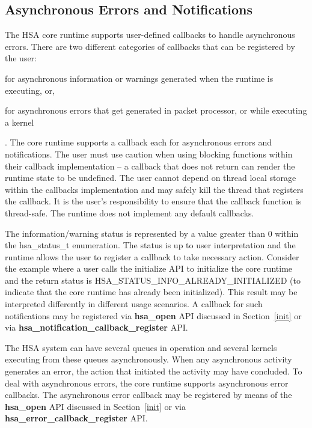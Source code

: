 \documentclass[final]{book}
\newcommand{\mariotodo}[1]{\todo[color=CarnationPink]{#1}}
\newcommand{\reffun}[1]{\textbf{#1}}
\newcommand{\reftyp}[1]{#1}
\newcommand{\refenu}[1]{\reftyp{#1}}
\begin{document}
\hypertarget{asyncerror}{}\subsection{Asynchronous Errors and
Notifications}\label{asyncerror}

The HSA core runtime supports user-defined callbacks to handle asynchronous
errors. There are two different \mariotodo{why separating them?} categories of
callbacks that can be registered by the user:\begin{inparaenum}[(i)]\item for
  asynchronous information or warnings generated when the runtime is executing,
  or, \item for asynchronous errors that get generated in packet processor, or
  while executing a kernel \end{inparaenum}. The core runtime supports a
callback each for asynchronous errors and notifications. The user must use
caution when using blocking functions within their callback implementation -- a
callback that does not return can render the runtime state to be undefined. The
user cannot depend on thread local storage within the callbacks implementation
and may safely kill the thread that registers the callback. It is the user's
responsibility to ensure that the callback function is thread-safe. The runtime
does not implement any default callbacks.

The information/warning status is represented by a value greater than 0 within
the \reftyp{hsa_status_t} enumeration. The status is up to user interpretation
and the runtime allows the user to register a callback to take necessary
action. Consider the example where a user calls the initialize API to initialize
the core runtime and the return status is
\refenu{HSA_STATUS_INFO_ALREADY_INITIALIZED} (to indicate that the core
runtime has already been initialized). This result may be interpreted
differently in different usage scenarios. A callback for such notifications may
be registered via \reffun{hsa_open} API discussed in Section~\ref{init} or via
\reffun{hsa_notification_callback_register} API.

The HSA system can have several queues in operation and several kernels
executing from these queues asynchronously. When any asynchronous activity
generates an error, the action that initiated the activity may have
concluded. To deal with asynchronous errors, the core runtime supports
asynchronous error callbacks. The asynchronous error callback may be registered
by means of the \reffun{hsa_open} API discussed in Section~\ref{init} or via
\reffun{hsa_error_callback_register} API.
\end{document}
